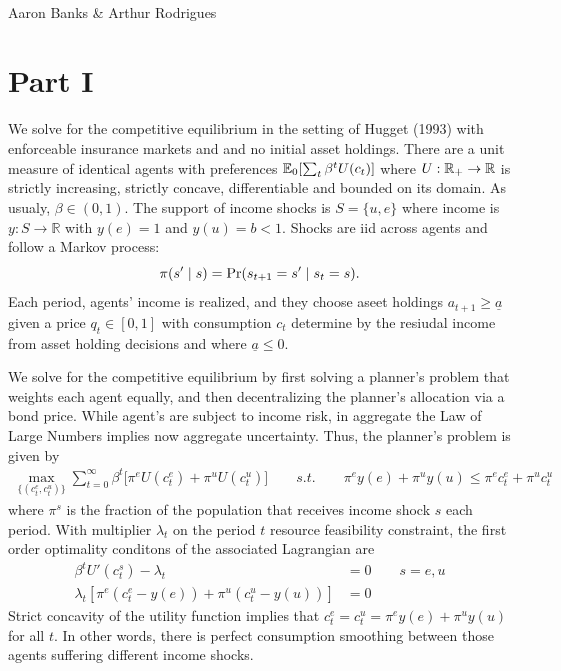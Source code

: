 \documentclass{article}
\begin{document}
    \begin{center}
        \\
        Aaron Banks \& Arthur Rodrigues  
    \end{center}

    \section*{Part I}

        We solve for the competitive equilibrium in the setting of Hugget (1993) with enforceable insurance markets and 
        and no initial asset holdings. There are a unit measure of identical agents
        with preferences $\mathbb{E}_0[\sum_t\beta^tU(c_t)]$ where $U:\mathbb{R}_+ \to \mathbb{R}$ is strictly increasing, strictly concave, differentiable
        and bounded on its domain. As usualy, $\beta\in (0,1)$. The support of income shocks is $S =\{u, e\}$ where income is 
        $y:S\to\mathbb{R}$ with $y(e) = 1$ and $y(u) =b < 1$. Shocks are iid across agents and follow a Markov process: 
        \[
            \pi(s' \mid s) = \mathrm{Pr}(s_{t+1} = s' \mid s_t = s).
        \]
        Each period, agents' income is realized, and they choose aseet holdings $a_{t+1} \geq \underline{a}$ 
        given a price $q_t \in [0,1]$ with consumption $c_t$ determine by the resiudal income from asset holding
        decisions and where $\underline{a} \leq 0$.

        We solve for the competitive equilibrium by first solving a planner's problem that weights each agent equally, and then
        decentralizing the planner's allocation via a bond price. While agent's are subject to income risk, in aggregate the Law 
        of Large Numbers implies now aggregate uncertainty. Thus, the planner's problem is given by 
        \begin{align*}
            \max_{\{(c_t^e, c_t^u)\}} \sum_{t=0}^\infty \beta^t \Big[\pi^e U(c_t^e) +  \pi^u U(c_t^u) \Big]  
            \qquad s.t. \qquad \pi^e y(e) + \pi^u y(u) \leq \pi^e c_t^e + \pi^u c_t^u
        \end{align*}
        where $\pi^s$ is the fraction of the population that receives income shock $s$ each period. With multiplier $\lambda_t$ 
        on the period $t$ resource feasibility constraint, the first order optimality conditons of the associated Lagrangian are 
        \begin{align*}
            \beta^t U'(c_t^s) - \lambda_t &= 0 \qquad s = e, u\\
            \lambda_t [\pi^e (c_t^e - y(e)) + \pi^u (c_t^u - y(u))] &= 0
        \end{align*}
        Strict concavity of the utility function implies that $c_t^e = c_t^u = \pi^e y(e) + \pi^u y(u)$ for all $t$. In other words, there is perfect
        consumption smoothing between those agents suffering different income shocks. 
\end{document}
